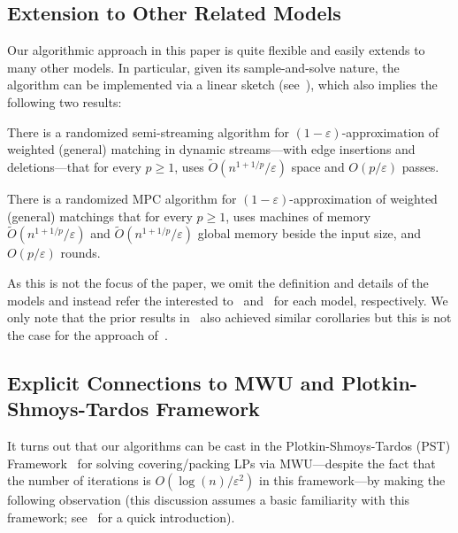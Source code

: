 \documentclass{article}
\renewcommand{\geq}{\geqslant}
\newcommand{\Ot}{\widetilde{O}}
\newcommand{\eps}{\varepsilon}
\begin{document}
\subsection{Extension to Other Related Models}\label{sec:ext-other-models}
 Our algorithmic approach in this paper is quite flexible and easily extends to many other models.  In particular, given its sample-and-solve nature, the algorithm can be implemented via
a linear sketch (see~\cite{AhnGM12}), which also implies the following two results:

\begin{corollary}
There is a randomized semi-streaming algorithm for $(1-\eps)$-approximation of weighted (general) matching in dynamic streams---with edge insertions and deletions---that for every $p \geq 1$, uses $\Ot(n^{1+1/p}/\eps)$ space and $O(p/\eps)$ passes. 
\end{corollary}

\begin{corollary}
There is a randomized MPC algorithm for $(1-\eps)$-approximation of weighted (general) matchings that for every  $p \geq 1$, uses machines of
memory $\Ot(n^{1+1/p}/\eps)$ and $\Ot(n^{1+1/p}/\eps)$  global memory beside the input size, and $O(p/\eps)$ rounds. 
\end{corollary}
As this is not the focus of the paper, we omit the definition and details of the models and instead
refer the interested to~\cite{AhnGM12,McGregor14} and~\cite{KarloffSV10,BeameKS13} for each model, respectively. 
We only note that the prior results in~\cite{AhnG15} also achieved similar corollaries but this is not the case for the approach of~\cite{AssadiJJST22}. 



\subsection{Explicit Connections to MWU and Plotkin-Shmoys-Tardos Framework}\label{sec:MWU}

It turns out that our algorithms can be cast in the Plotkin-Shmoys-Tardos (PST) Framework~\cite{PlotkinST91} for solving covering/packing LPs via MWU---despite the fact that the number of iterations is $O(\log{\!(n)}/\eps^2)$ in this framework---by making the following observation (this discussion assumes 
a basic familiarity with this framework; see~\cite{AroraHK12} for a quick introduction). 
\end{document}
